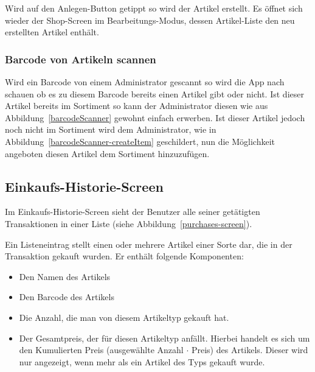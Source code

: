 Wird auf den Anlegen-Button getippt so wird der Artikel erstellt.
Es öffnet sich wieder der Shop-Screen im Bearbeitungs-Modus, dessen Artikel-Liste den neu erstellten Artikel enthält.

\subsubsection{Barcode von Artikeln scannen} \label{subsubsec:shop-admin-scan-item}

Wird ein Barcode von einem Administrator gescannt so wird die App nach schauen ob es zu diesem Barcode bereits einen Artikel gibt oder nicht.
Ist dieser Artikel bereits im Sortiment so kann der Administrator diesen wie aus Abbildung~\ref{barcodeScanner} gewohnt einfach erwerben.
Ist dieser Artikel jedoch noch nicht im Sortiment wird dem Administrator, wie in Abbildung~\ref{barcodeScanner-createItem} geschildert, nun die Möglichkeit angeboten diesen Artikel dem Sortiment hinzuzufügen.


\subsection{Einkaufs-Historie-Screen} \label{subsec:purchases-screen}

Im Einkaufs-Historie-Screen sieht der Benutzer alle seiner getätigten Transaktionen in einer Liste (siehe Abbildung~\ref{purchases-screen}).

Ein Listeneintrag stellt einen oder mehrere Artikel einer Sorte dar, die in der Transaktion gekauft wurden.
Er enthält folgende Komponenten:

\begin{itemize}
	\item Den Namen des Artikels

	\item Den Barcode des Artikels

	\item Die Anzahl, die man von diesem Artikeltyp gekauft hat.

	\item Der Gesamtpreis, der für diesen Artikeltyp anfällt.
	Hierbei handelt es sich um den Kumulierten Preis (ausgewählte Anzahl $\cdot$ Preis) des Artikels.
	Dieser wird nur angezeigt, wenn mehr als ein Artikel des Typs gekauft wurde.
\end{itemize}

